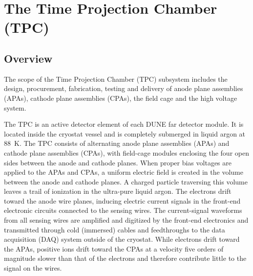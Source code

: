 
\section{The Time Projection Chamber (TPC)} 
\label{sec:detectors-fd-ref-tpc}

\subsection{Overview}

The scope of the Time Projection Chamber (TPC) subsystem includes the
design, procurement, fabrication, testing and delivery of anode plane
assemblies (APAs), cathode plane assemblies (CPAs), the field cage and
the high voltage system.


The TPC is an active detector element of each DUNE
far detector module. It is located inside the cryostat vessel and is
completely submerged in liquid argon at 88~K. The TPC consists of
alternating anode plane assemblies (APAs) and cathode plane assemblies
(CPAs), with field-cage modules enclosing the four open sides between
the anode and cathode planes.  When proper bias voltages are applied
to the APAs and CPAs, a uniform electric field is created in the volume
between the anode and cathode planes. A charged particle traversing
this volume leaves a trail of ionization in the ultra-pure liquid
argon.  The electrons drift toward the anode wire planes, inducing
electric current signals in the front-end electronic circuits
connected to the sensing wires.  The current-signal waveforms from all
sensing wires are amplified and digitized by the front-end electronics
and transmitted through cold (immersed) cables and feedthroughs to the data
acquisition (DAQ) system outside of the cryostat. While electrons drift
toward the APAs, positive ions drift toward the CPAs at a velocity five orders of 
magnitude slower than that of the electrons and therefore contribute little to the signal on the wires.  



